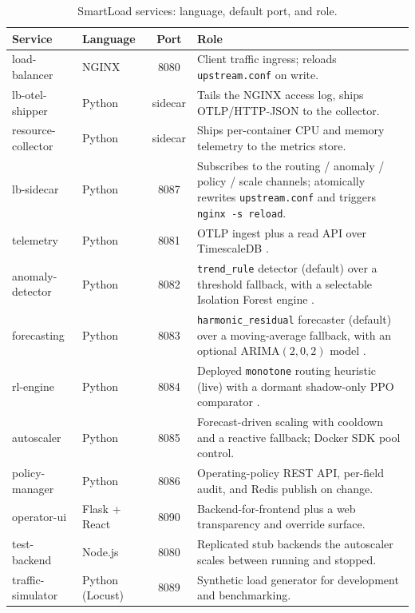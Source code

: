 \begin{table}[htbp]
  \centering
  \caption[SmartLoad services: language, port, and role]{SmartLoad services: language, default port, and role.}
  \label{bm:tab-services}
  \small
  \begin{tabularx}{\linewidth}{@{}l l c Y@{}}
    \toprule
    \textbf{Service} & \textbf{Language} & \textbf{Port} & \textbf{Role} \\
    \midrule
    load-balancer    & NGINX \cite{nginx}   & 8080    & Client traffic ingress; reloads \texttt{upstream.conf} on write. \\
    lb-otel-shipper  & Python               & sidecar & Tails the NGINX access log, ships OTLP/HTTP-JSON to the collector. \\
    resource-collector & Python             & sidecar & Ships per-container CPU and memory telemetry to the metrics store. \\
    lb-sidecar       & Python               & 8087    & Subscribes to the routing / anomaly / policy / scale channels; atomically rewrites \texttt{upstream.conf} and triggers \texttt{nginx -s reload}. \\
    telemetry        & Python               & 8081    & OTLP ingest plus a read API over TimescaleDB \cite{timescaledb}. \\
    anomaly-detector & Python               & 8082    & \texttt{trend\_rule} detector (default) over a threshold fallback, with a selectable Isolation Forest engine \cite{liu2008isolationforest}. \\
    forecasting      & Python               & 8083    & \texttt{harmonic\_residual} forecaster (default) over a moving-average fallback, with an optional ARIMA$(2,0,2)$ model \cite{box2015timeseries}. \\
    rl-engine        & Python               & 8084    & Deployed \texttt{monotone} routing heuristic (live) with a dormant shadow-only PPO comparator \cite{schulman2017ppo}. \\
    autoscaler       & Python               & 8085    & Forecast-driven scaling with cooldown and a reactive fallback; Docker SDK pool control. \\
    policy-manager   & Python               & 8086    & Operating-policy REST API, per-field audit, and Redis publish on change. \\
    operator-ui      & Flask + React        & 8090    & Backend-for-frontend plus a web transparency and override surface. \\
    test-backend     & Node.js              & 8080    & Replicated stub backends the autoscaler scales between running and stopped. \\
    traffic-simulator & Python (Locust)     & 8089    & Synthetic load generator for development and benchmarking. \\
    \bottomrule
  \end{tabularx}
\end{table}

